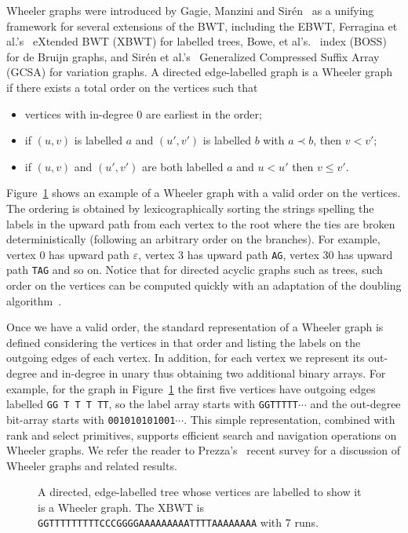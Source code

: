 Wheeler graphs were introduced by Gagie, Manzini and Sir\'en~\cite{gagie2017wheeler} as a unifying framework for several extensions of the BWT, including the EBWT, Ferragina et al.'s~\cite{ferragina2009compressing} eXtended BWT (XBWT) for labelled trees, Bowe, et al's.~\cite{bowe2012succinct} index (BOSS) for de Bruijn graphs, and Sir\'en et al.'s~\cite{siren2014indexing} Generalized Compressed Suffix Array (GCSA) for variation graphs.  A directed edge-labelled graph is a Wheeler graph if there exists a total order on the vertices such that
\begin{itemize}
\item vertices with in-degree 0 are earliest in the order;
\item if $(u, v)$ is labelled $a$ and $(u', v')$ is labelled $b$ with $a \prec b$, then $v < v'$;
\item if $(u, v)$ and $(u', v')$ are both labelled $a$ and $u < u'$ then $v \leq v'$.
\end{itemize}
Figure~\ref{fig:XBWT} shows an example of a Wheeler graph with a valid order on the vertices.  {The ordering is obtained by lexicographically sorting the strings spelling the labels in the upward path from each vertex to the root where the ties are broken deterministically (following an arbitrary order on the branches). For example, vertex 0 has upward path $\varepsilon$, vertex 3 has upward path {\tt AG}, vertex 30 has upward path {\tt TAG} and so on.} Notice that for directed acyclic graphs such as trees, such order on the vertices can be computed quickly with an adaptation of the doubling algorithm~\cite{doubling_algorithm}.

{Once we have a valid order, the standard representation of a Wheeler graph is defined considering the vertices in that order and listing the labels on the outgoing edges of each vertex. In addition, for each vertex we represent its out-degree and in-degree in unary thus obtaining two additional binary arrays. For example, for the graph in Figure~\ref{fig:XBWT} the first five vertices have outgoing edges labelled \texttt{GG T T T TT}, so the label array starts with {\tt GGTTTTT}$\cdots$ and the out-degree bit-array starts with {\tt 001010101001}$\cdots$. This simple representation, combined with {\sf rank} and {\sf select} primitives, supports efficient search and navigation operations on Wheeler graphs.} We refer the reader to Prezza's~\cite{prezza2021subpath} recent survey for a discussion of Wheeler graphs and related results.

\begin{figure}[t]
\begin{center}
\caption{A directed, edge-labelled tree whose vertices are labelled to show it is a Wheeler graph.  The XBWT is {\tt GGTTTTTTTTTCCCGGGGAAAAAAAAATTTTAAAAAAAA} with 7 runs.}
\label{fig:XBWT}
\end{center}
\end{figure}

